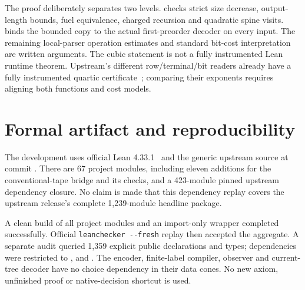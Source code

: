 The proof deliberately separates two levels.  checks
strict size decrease, output-length bounds, fuel equivalence, charged recursion
and quadratic spine visits.  binds
the bounded copy to the actual first-preorder decoder on every input. The
remaining local-parser operation estimates and standard bit-cost interpretation
are written arguments. The cubic statement is not a fully instrumented Lean
runtime theorem. Upstream's different row/terminal/bit readers already have a
fully instrumented quartic certificate~\cite{quartic}; comparing their exponents
requires aligning both functions and cost models.

\section{Formal artifact and reproducibility}\label{sec:verification}

The development uses official Lean 4.33.1~\cite{lean} and the generic upstream source at
commit . There are 67 project
modules, including eleven additions for the conventional-tape bridge and its
checks, and a 423-module pinned upstream dependency closure. No claim is made
that this dependency replay covers the upstream release's complete
1,239-module headline package.

A clean build of all project modules and an import-only wrapper completed
successfully. Official {\small\texttt{leanchecker \mbox{-}\mbox{-}fresh}} replay then accepted the
aggregate. A separate audit queried 1,359 explicit public declarations and
types; dependencies were restricted to ,  and
. The encoder, finite-label compiler, observer and
current-tree decoder have no choice dependency in their data cones. No new
axiom, unfinished proof or native-decision shortcut is used.

